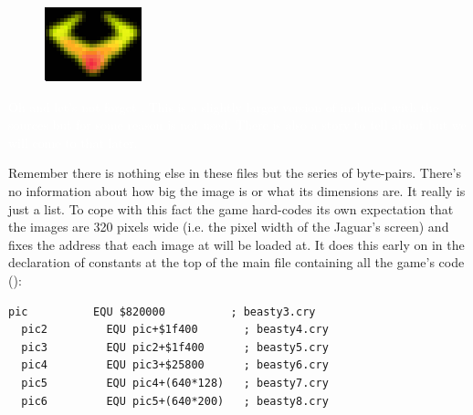 \begin{definition}
\setlength{\intextsep}{0pt}%
\setlength{\columnsep}{3pt}%
\begin{figure}
\includegraphics[width=\linewidth]{src/callout/claw.png} 
\end{figure}
\small
\textcolor{white}{
  Oh and let's not forget . This is a slightly larger version of  included with the sources
  but for some reason is not used. There is also a story to tell about  but we will come to that later.
}
\end{definition}

Remember there is nothing else in these files but the series of byte-pairs. There's no information about how big the image is or what
its dimensions are. It really is just a list. To cope with this fact the game hard-codes its own expectation that the
images are 320 pixels wide (i.e. the pixel width of the Jaguar's screen) and fixes the address that each image at will be loaded at.
It does this early on in the declaration of constants at the top of the main file containing all the game's code ():

\begin{lstlisting}[escapechar=\%]
  pic          EQU $820000          ; beasty3.cry
  pic2         EQU pic+$1f400       ; beasty4.cry
  pic3         EQU pic2+$1f400      ; beasty5.cry
  pic4         EQU pic3+$25800      ; beasty6.cry
  pic5         EQU pic4+(640*128)   ; beasty7.cry
  pic6         EQU pic5+(640*200)   ; beasty8.cry
\end{lstlisting}

